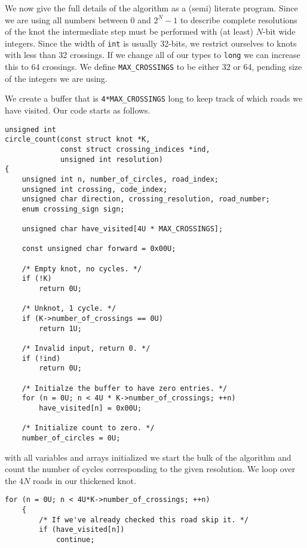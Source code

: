         We now give the full details of the algorithm as a
        (semi) literate program. Since we are using all
        numbers between 0 and $2^{N}-1$ to describe complete resolutions of the
        knot the intermediate step must be performed with (at least) $N$-bit
        wide integers. Since the width of \texttt{int} is usually 32-bits, we
        restrict ourselves to knots with less than 32 crossings. If we change
        all of our types to \texttt{long} we can increase this to 64 crossings.
        We define \texttt{MAX\_CROSSINGS} to be either 32 or 64, pending size
        of the integers we are using.
        \par\hfill\par
        We create a buffer that is \texttt{4*MAX\_CROSSINGS} long to keep track
        of which roads we have visited. Our code starts as follows.
\begin{lstlisting}[style=CStyle]
unsigned int
circle_count(const struct knot *K,
             const struct crossing_indices *ind,
             unsigned int resolution)
{
    unsigned int n, number_of_circles, road_index;
    unsigned int crossing, code_index;
    unsigned char direction, crossing_resolution, road_number;
    enum crossing_sign sign;

    unsigned char have_visited[4U * MAX_CROSSINGS];

    const unsigned char forward = 0x00U;

    /* Empty knot, no cycles. */
    if (!K)
        return 0U;

    /* Unknot, 1 cycle. */
    if (K->number_of_crossings == 0U)
        return 1U;

    /* Invalid input, return 0. */
    if (!ind)
        return 0U;

    /* Initialze the buffer to have zero entries. */
    for (n = 0U; n < 4U * K->number_of_crossings; ++n)
        have_visited[n] = 0x00U;

    /* Initialize count to zero. */
    number_of_circles = 0U;
\end{lstlisting}
        with all variables and arrays initialized we start the bulk of the
        algorithm and count the number of cycles corresponding to the given
        resolution. We loop over the $4N$ roads in our thickened knot.
\begin{lstlisting}[style=CStyle, firstnumber = 34]
    for (n = 0U; n < 4U*K->number_of_crossings; ++n)
    {
        /* If we've already checked this road skip it. */
        if (have_visited[n])
            continue;
\end{lstlisting}
